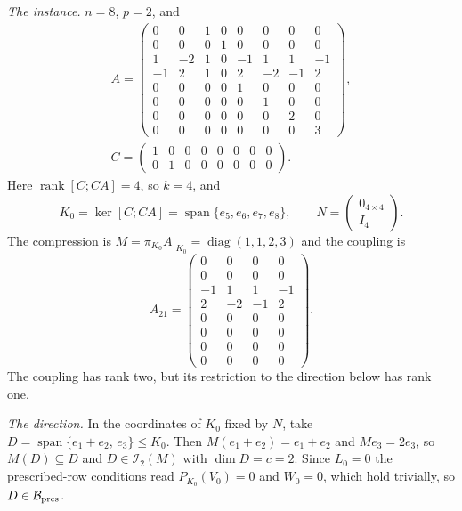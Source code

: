 \documentclass[journal]{IEEEtran}
\theoremstyle{plainn}
\theoremstyle{remark}
\newcommand{\rank}{\operatorname{rank}}
\begin{document}
\emph{The instance.} $n=8$, $p=2$, and
\begin{equation}\label{eq:exA}
\begin{gathered}
A=\begin{pmatrix}
0 & 0 & 1 & 0 & 0 & 0 & 0 & 0\\
0 & 0 & 0 & 1 & 0 & 0 & 0 & 0\\
1 & -2 & 1 & 0 & -1 & 1 & 1 & -1\\
-1 & 2 & 1 & 0 & 2 & -2 & -1 & 2\\
0 & 0 & 0 & 0 & 1 & 0 & 0 & 0\\
0 & 0 & 0 & 0 & 0 & 1 & 0 & 0\\
0 & 0 & 0 & 0 & 0 & 0 & 2 & 0\\
0 & 0 & 0 & 0 & 0 & 0 & 0 & 3
\end{pmatrix},\\
C=\begin{pmatrix}
1&0&0&0&0&0&0&0\\ 0&1&0&0&0&0&0&0
\end{pmatrix}.
\end{gathered}
\end{equation}
Here $\rank[C;CA]=4$, so $k=4$, and
\[
K_0=\ker[C;CA]=\operatorname{span}\{e_5,e_6,e_7,e_8\},\qquad
N=\begin{pmatrix}0_{4\times4}\\ I_4\end{pmatrix}.
\]
The compression is $M=\pi_{K_0}A|_{K_0}=\operatorname{diag}(1,1,2,3)$ and the coupling is
\[
A_{21}=\begin{pmatrix}
0&0&0&0\\ 0&0&0&0\\ -1&1&1&-1\\ 2&-2&-1&2\\ 0&0&0&0\\ 0&0&0&0\\ 0&0&0&0\\ 0&0&0&0
\end{pmatrix}.
\]
The coupling has rank two, but its restriction to the direction below has rank one.

\emph{The direction.} In the coordinates of $K_0$ fixed by $N$, take
$D=\operatorname{span}\{e_1+e_2,\,e_3\}\le K_0$. Then $M(e_1+e_2)=e_1+e_2$ and $Me_3=2e_3$, so
$M(D)\subseteq D$ and $D\in\mathcal I_2(M)$ with $\dim D=c=2$. Since $L_0=0$ the prescribed-row
conditions read $P_{K_0}(V_0)=0$ and $W_0=0$, which hold trivially, so $D\in\mathcal B_{\rm pres}$.
\end{document}
